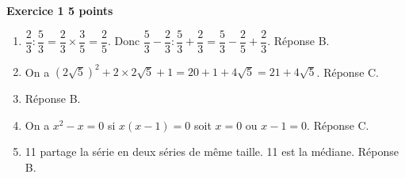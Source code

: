 \textbf{Exercice 1 \hfill 5 points}

\medskip 

%
%
%
%
\begin{enumerate}
\item $\dfrac{2}{3} : \dfrac{5}{3} = \dfrac{2}{3} \times \dfrac{3}{5} = \dfrac{2}{5}$. Donc  $\dfrac{5}{3} -  \dfrac{2}{3} : \dfrac{5}{3} + \dfrac{2}{3} = \dfrac{5}{3} - \dfrac{2}{5} + \dfrac{2}{3}$. Réponse B.
\item On a $\left(2\sqrt{5} \right)^2 + 2 \times 2\sqrt{5} + 1 = 20 + 1 + 4\sqrt{5} = 21 + 4\sqrt{5}$. Réponse C.
\item Réponse B.
\item On a $x^2 - x = 0$ si $x(x - 1) = 0$ soit $x = 0$ ou $x - 1 = 0$. Réponse C.
\item 11 partage la série en deux séries de même taille. 11 est la médiane. Réponse B.
\end{enumerate}

\bigskip

